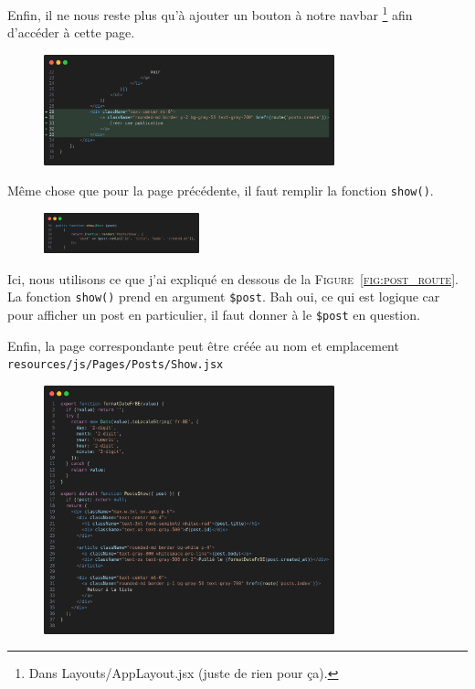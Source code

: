 Enfin, il ne nous reste plus qu'à ajouter un bouton à notre navbar \footnote{Dans Layouts/AppLayout.jsx (juste de rien pour ça).} afin d'accéder à cette page.

\begin{figure}[!h]
    \centering
    \includegraphics[width=0.75\textwidth]{figures-C1/posts_index_add_create.png}
\end{figure}

\label{sec:post_show}

Même chose que pour la page précédente, il faut remplir la fonction \verb|show()|.

\begin{figure}
    \vspace{-0.75cm}
    \includegraphics[width=0.4\textwidth]{figures-C1/postscontroller_show.png}
\end{figure}
Ici, nous utilisons ce que j'ai expliqué en dessous de la \textsc{Figure~\ref{fig:post_route}}. La fonction \verb|show()| prend en argument \verb|$post|. Bah oui, ce qui est logique car pour afficher un post en particulier, il faut donner à \laravel le \texttt{\$post} en question. 

Enfin, la page correspondante peut être créée au nom et emplacement \texttt{resources/js/Pages/Posts/Show.jsx}

\begin{figure}[!h]
    \centering
    \includegraphics[width=0.75\textwidth]{figures-C1/posts_show.png}
\end{figure}

